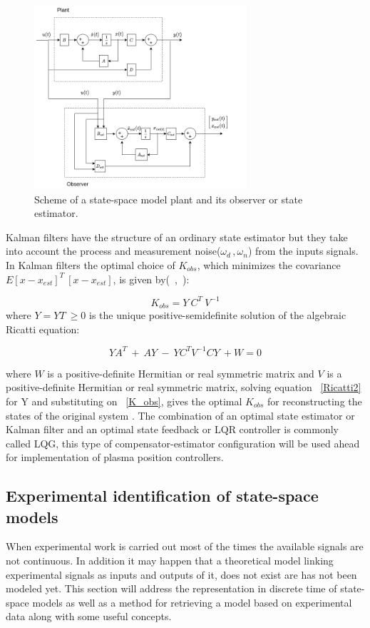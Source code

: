 \begin{figure}[h]
	\centering
	\includegraphics[width=0.7\textwidth]{Chp2/plant_observer.png}
	\caption{ Scheme of a state-space model plant and its observer or state estimator. \label{plant_obser}}
\end{figure}

Kalman filters have the structure of an ordinary state estimator but they take into account the process and measurement noise($\omega_d\,,\omega_n$) from the inputs signals. In Kalman filters the optimal choice of $K_{obs}$, which minimizes  the covariance $E{[x-x_{est}]^T~[x-x_{est}]}$, is given by(~\cite[Chapter~9]{Skogestad},~\cite[Chapter~8]{Hippe2009}):  

\begin{equation}
K_{obs}=Y~C^T~V^{-1}
\label{K_obs}
\end{equation}
 where $Y=Y{ T}~ \geq 0$ is the unique positive-semidefinite solution of the algebraic Ricatti equation:
 
 
\begin{equation}
YA^T~+~AY~-~YC^TV^{-1}CY~+W=0
\label{Ricatti2}
\end{equation}

where $W$ is a positive-definite Hermitian or real symmetric matrix and $V$ is a positive-definite Hermitian or real symmetric matrix, solving equation ~\ref{Ricatti2} for Y and substituting on ~\ref{K_obs}, gives the optimal $K_{obs}$ for reconstructing the states of the original system . The combination of an optimal state estimator or Kalman filter  and an optimal state feedback or LQR controller is commonly called LQG, this type of compensator-estimator configuration will be used ahead for implementation of plasma position controllers. 

\subsection{Experimental identification of state-space models}
\label{data_drivenSec}
When experimental work is carried out most of the times the available signals are not continuous. In addition it may happen that a theoretical model  linking experimental signals as inputs and outputs of it, does not exist are has not been modeled yet. This section will address the representation in discrete time of state-space models as well as a method for retrieving a model based on experimental data  along with some useful concepts.
\smallskip

